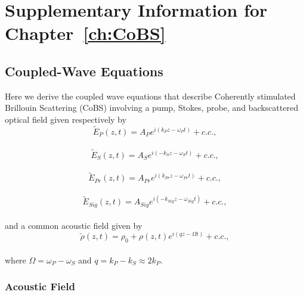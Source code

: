 \doublespacing
\chapter{Supplementary Information for Chapter~\ref{ch:CoBS}}
\label{appendix: CoBS}
\acresetall


\section{Coupled-Wave Equations}
\label{Appendix:Coupled-Wave Equations}

Here we derive the coupled wave equations that describe Coherently stimulated Brillouin Scattering (\acs{CoBS}) involving a pump, Stokes, probe, and backscattered optical field given respectively by
\\
\begin{equation}
    \tilde{E}_{P}(z,t) = A_{P}e^{i(k_{P}z - \omega_{P}t)} + c.c.,
    \label{eq:Pump optical field}
\end{equation}
\\
\begin{equation}
    \tilde{E}_{S}(z,t) = A_{S}e^{i(-k_{S}z - \omega_{S}t)} + c.c.,
    \label{eq:Stokes optical field}
\end{equation}
\\
\begin{equation}
    \tilde{E}_{Pr}(z,t) = A_{Pr}e^{i(k_{Pr}z - \omega_{Pr}t)} + c.c.,
    \label{eq:Probe optical field}
\end{equation}
\\
\begin{equation}
    \tilde{E}_{Sig}(z,t) = A_{Sig}e^{i(-k_{Sig}z - \omega_{Sig}t)} + c.c.,
    \label{eq:Signal optical field}
\end{equation}
\\
\noindent and a common acoustic field given by
\\
\begin{equation}
    \tilde{\rho}(z,t) = \rho_{0} + \rho(z,t)e^{i(qz - \Omega t)} + c.c.,
    \label{eq:acoustic field}
\end{equation}
\\
\noindent where \(\Omega = \omega_{P} - \omega_{S}\) and \(q = k_{P} - k_{S} \approx 2k_{P}\).


\subsection{Acoustic Field}
\label{Coupled-Wave Equations:Acoustic Field}

